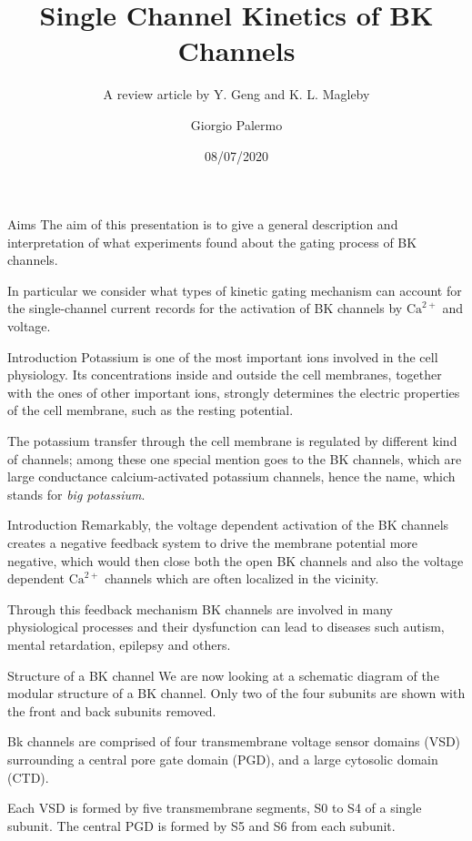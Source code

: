 \documentclass{beamer}
\title{Single Channel Kinetics of BK Channels}
\subtitle{A review article by Y. Geng and K. L. Magleby}
\author{Giorgio Palermo}
\date{08/07/2020}
\institute{LM Physics - a.a. 2019/20 - Biological Physics }
\newcommand{\ca}{\text{Ca}^{2+}}
\begin{document}
\begin{frame}{}
  \titlepage
\end{frame}

\begin{frame}{Aims}
The aim of this presentation is to give a general description and interpretation of what experiments found about the gating process of BK channels.

In particular we consider what types of kinetic gating mechanism can account for the single-channel current records for the activation of BK channels by $\ca$ and voltage.

\end{frame}

\begin{frame}{Introduction}
Potassium is one of the most important ions involved in the cell physiology.
Its concentrations inside and outside the cell membranes, together with the ones of other important ions, strongly determines the electric properties of the cell membrane, such as the resting potential.

The potassium transfer through the cell membrane is regulated by different kind of channels; among these one special mention goes to the BK channels, which are large conductance calcium-activated potassium channels, hence the name, which stands for \emph{big potassium}. %

\end{frame}

\begin{frame}{Introduction}
Remarkably, the voltage dependent activation of the BK channels creates a negative feedback system to drive the membrane potential more negative, which would then close both the open BK channels and also the voltage dependent $\ca$ channels which are often localized in the vicinity.

Through this feedback mechanism BK channels are involved in many physiological processes and their dysfunction can lead to diseases such autism, mental retardation, epilepsy and others.
\end{frame}

\begin{frame}{Structure of a BK channel}
We are now looking at a schematic diagram of the modular structure of a BK channel.
Only two of the four subunits are shown with the front and back subunits removed.

Bk channels are comprised of four transmembrane voltage sensor domains (VSD) surrounding a central pore gate domain (PGD), and a large cytosolic domain (CTD).

Each VSD is formed by five transmembrane segments, S0 to S4 of a single subunit.
The central PGD is formed by S5 and S6 from each subunit.

\end{frame}
\end{document}
